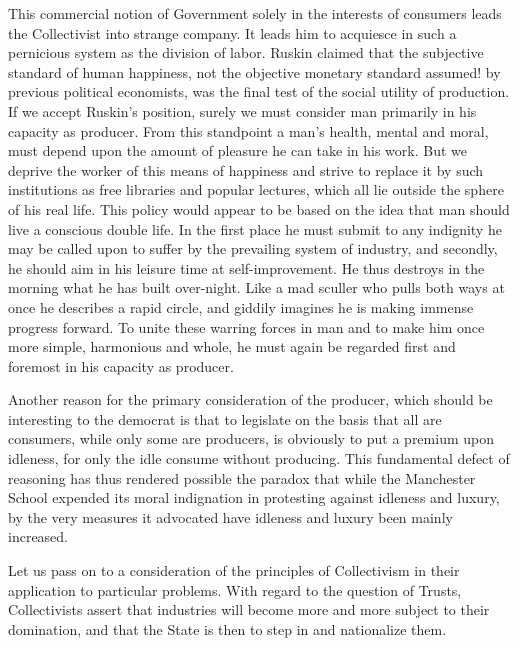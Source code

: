 \documentclass{book}
\begin{document}
This commercial notion of Government solely in the interests of consumers leads the Collectivist into strange company. It leads him to acquiesce in such a pernicious system as the division of labor. Ruskin claimed that the subjective standard of human happiness, not the objective monetary standard assumed! by previous political economists, was the final test of the social utility of production. If we accept Ruskin’s position, surely we must consider man primarily in his capacity as producer. From this standpoint a man’s health, mental and moral, must depend upon the amount of pleasure he can take in his work. But we deprive the worker of this means of happiness and strive to replace it by such institutions as free libraries and popular lectures, which all lie outside the sphere of his real life. This policy would appear to be based on the idea that man should live a conscious double life. In the first place he must submit to any indignity he may be called upon to suffer by the prevailing system of industry, and secondly, he should aim in his leisure time at self-improvement. He thus destroys in the morning what he has built over-night. Like a mad sculler who pulls both ways at once he describes a rapid circle, and giddily imagines he is making immense progress forward. To unite these warring forces in man and to make him once more simple, harmonious and whole, he must again be regarded first and foremost in his capacity as producer.

Another reason for the primary consideration of the producer, which should be interesting to the democrat is that to legislate on the basis that all are consumers, while only some are producers, is obviously to put a premium upon idleness, for only the idle consume without producing. This fundamental defect of reasoning has thus rendered possible the paradox that while the Manchester School expended its moral indignation in protesting against idleness and luxury, by the very measures it advocated have idleness and luxury been mainly increased.

Let us pass on to a consideration of the principles of Collectivism in their application to particular problems. With regard to the question of Trusts, Collectivists assert that industries will become more and more subject to their domination, and that the State is then to step in and nationalize them.
\end{document}

